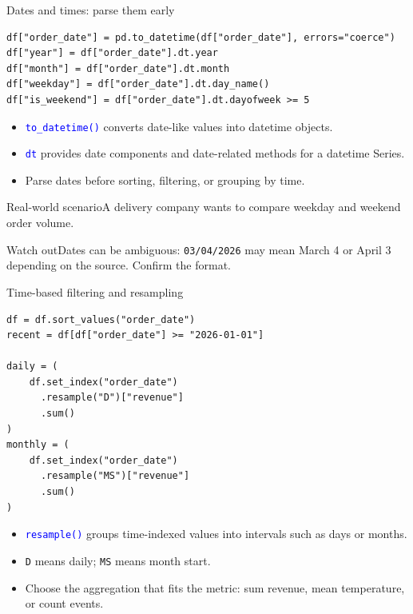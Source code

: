 \documentclass[aspectratio=169,10pt]{beamer}
\newcommand{\scenario}[1]{\begin{block}{Real-world scenario}#1\end{block}}
\newcommand{\pitfall}[1]{\begin{alertblock}{Watch out}#1\end{alertblock}}
\newcommand{\method}[1]{\texttt{\textcolor{Blue}{#1}}}
\begin{document}
\begin{frame}[fragile]{Dates and times: parse them early}
\begin{lstlisting}
df["order_date"] = pd.to_datetime(df["order_date"], errors="coerce")
df["year"] = df["order_date"].dt.year
df["month"] = df["order_date"].dt.month
df["weekday"] = df["order_date"].dt.day_name()
df["is_weekend"] = df["order_date"].dt.dayofweek >= 5
\end{lstlisting}
\begin{itemize}
\item \method{to\_datetime()} converts date-like values into datetime objects.
\item \method{dt} provides date components and date-related methods for a datetime Series.
\item Parse dates before sorting, filtering, or grouping by time.
\end{itemize}
\scenario{A delivery company wants to compare weekday and weekend order volume.}
\pitfall{Dates can be ambiguous: \texttt{03/04/2026} may mean March 4 or April 3 depending on the source. Confirm the format.}
\end{frame}

\begin{frame}[fragile]{Time-based filtering and resampling}
\begin{lstlisting}
df = df.sort_values("order_date")
recent = df[df["order_date"] >= "2026-01-01"]

daily = (
    df.set_index("order_date")
      .resample("D")["revenue"]
      .sum()
)
monthly = (
    df.set_index("order_date")
      .resample("MS")["revenue"]
      .sum()
)
\end{lstlisting}
\begin{itemize}
\item \method{resample()} groups time-indexed values into intervals such as days or months.
\item \texttt{D} means daily; \texttt{MS} means month start.
\item Choose the aggregation that fits the metric: sum revenue, mean temperature, or count events.
\end{itemize}
\end{frame}
\end{document}
